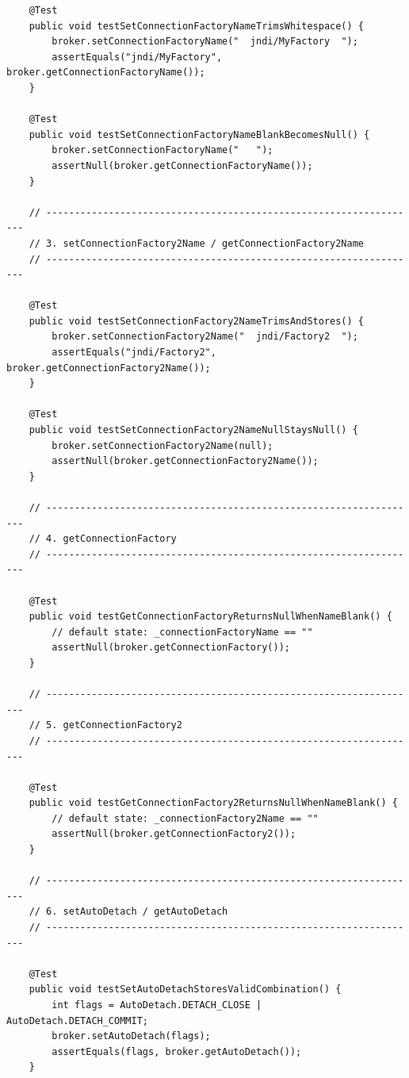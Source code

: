 \begin{lstlisting}
    @Test
    public void testSetConnectionFactoryNameTrimsWhitespace() {
        broker.setConnectionFactoryName("  jndi/MyFactory  ");
        assertEquals("jndi/MyFactory", broker.getConnectionFactoryName());
    }

    @Test
    public void testSetConnectionFactoryNameBlankBecomesNull() {
        broker.setConnectionFactoryName("   ");
        assertNull(broker.getConnectionFactoryName());
    }

    // ------------------------------------------------------------------
    // 3. setConnectionFactory2Name / getConnectionFactory2Name
    // ------------------------------------------------------------------

    @Test
    public void testSetConnectionFactory2NameTrimsAndStores() {
        broker.setConnectionFactory2Name("  jndi/Factory2  ");
        assertEquals("jndi/Factory2", broker.getConnectionFactory2Name());
    }

    @Test
    public void testSetConnectionFactory2NameNullStaysNull() {
        broker.setConnectionFactory2Name(null);
        assertNull(broker.getConnectionFactory2Name());
    }

    // ------------------------------------------------------------------
    // 4. getConnectionFactory
    // ------------------------------------------------------------------

    @Test
    public void testGetConnectionFactoryReturnsNullWhenNameBlank() {
        // default state: _connectionFactoryName == ""
        assertNull(broker.getConnectionFactory());
    }

    // ------------------------------------------------------------------
    // 5. getConnectionFactory2
    // ------------------------------------------------------------------

    @Test
    public void testGetConnectionFactory2ReturnsNullWhenNameBlank() {
        // default state: _connectionFactory2Name == ""
        assertNull(broker.getConnectionFactory2());
    }

    // ------------------------------------------------------------------
    // 6. setAutoDetach / getAutoDetach
    // ------------------------------------------------------------------

    @Test
    public void testSetAutoDetachStoresValidCombination() {
        int flags = AutoDetach.DETACH_CLOSE | AutoDetach.DETACH_COMMIT;
        broker.setAutoDetach(flags);
        assertEquals(flags, broker.getAutoDetach());
    }


\end{lstlisting}
